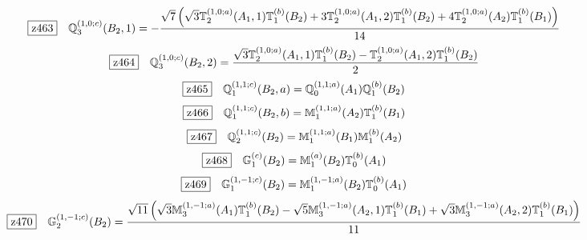 \documentclass[fleqn,10pt,landscape]{jsarticle}
\begin{document}
\begin{dmath*}
\hspace*{3mm}\fbox{z463}\quad \mathbb{Q}_{3}^{(1,0;c)}(B_{2},1)=- \frac{\sqrt{7} \left(\sqrt{3} \mathbb{T}_{2}^{(1,0;a)}(A_{1},1) \mathbb{T}_{1}^{(b)}(B_{2}) + 3 \mathbb{T}_{2}^{(1,0;a)}(A_{1},2) \mathbb{T}_{1}^{(b)}(B_{2}) + 4 \mathbb{T}_{2}^{(1,0;a)}(A_{2}) \mathbb{T}_{1}^{(b)}(B_{1})\right)}{14}
\end{dmath*}
\begin{dmath*}
\hspace*{3mm}\fbox{z464}\quad \mathbb{Q}_{3}^{(1,0;c)}(B_{2},2)=\frac{\sqrt{3} \mathbb{T}_{2}^{(1,0;a)}(A_{1},1) \mathbb{T}_{1}^{(b)}(B_{2}) - \mathbb{T}_{2}^{(1,0;a)}(A_{1},2) \mathbb{T}_{1}^{(b)}(B_{2})}{2}
\end{dmath*}
\begin{dmath*}
\hspace*{3mm}\fbox{z465}\quad \mathbb{Q}_{1}^{(1,1;c)}(B_{2},a)=\mathbb{Q}_{0}^{(1,1;a)}(A_{1}) \mathbb{Q}_{1}^{(b)}(B_{2})
\end{dmath*}
\begin{dmath*}
\hspace*{3mm}\fbox{z466}\quad \mathbb{Q}_{1}^{(1,1;c)}(B_{2},b)=\mathbb{M}_{1}^{(1,1;a)}(A_{2}) \mathbb{T}_{1}^{(b)}(B_{1})
\end{dmath*}
\begin{dmath*}
\hspace*{3mm}\fbox{z467}\quad \mathbb{Q}_{2}^{(1,1;c)}(B_{2})=\mathbb{M}_{1}^{(1,1;a)}(B_{1}) \mathbb{M}_{1}^{(b)}(A_{2})
\end{dmath*}
\begin{dmath*}
\hspace*{3mm}\fbox{z468}\quad \mathbb{G}_{1}^{(c)}(B_{2})=\mathbb{M}_{1}^{(a)}(B_{2}) \mathbb{T}_{0}^{(b)}(A_{1})
\end{dmath*}
\begin{dmath*}
\hspace*{3mm}\fbox{z469}\quad \mathbb{G}_{1}^{(1,-1;c)}(B_{2})=\mathbb{M}_{1}^{(1,-1;a)}(B_{2}) \mathbb{T}_{0}^{(b)}(A_{1})
\end{dmath*}
\begin{dmath*}
\hspace*{3mm}\fbox{z470}\quad \mathbb{G}_{2}^{(1,-1;c)}(B_{2})=\frac{\sqrt{11} \left(\sqrt{3} \mathbb{M}_{3}^{(1,-1;a)}(A_{1}) \mathbb{T}_{1}^{(b)}(B_{2}) - \sqrt{5} \mathbb{M}_{3}^{(1,-1;a)}(A_{2},1) \mathbb{T}_{1}^{(b)}(B_{1}) + \sqrt{3} \mathbb{M}_{3}^{(1,-1;a)}(A_{2},2) \mathbb{T}_{1}^{(b)}(B_{1})\right)}{11}
\end{dmath*}
\end{document}
